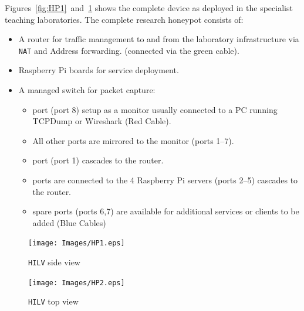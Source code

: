 \documentclass{llncs}
\begin{document}
Figures~\ref{fig:HP1}~and~\ref{fig:HP2} shows the complete device as deployed
in the specialist teaching laboratories. The complete research honeypot
consists of:

\begin{itemize}
    \item \noindent A router for traffic management to and from the laboratory
      infrastructure via \texttt{NAT} and Address forwarding. (connected via the
      green cable).  \item {} Raspberry Pi boards for service deployment.
    \item \noindent A managed switch for packet capture:
    \begin{itemize}
        \item {} port (port 8) setup as a monitor usually connected to
          a PC running TCPDump or Wireshark (Red Cable).
        \item \noindent All other ports are mirrored to the monitor (ports
          1--7).
        \item {} port (port 1) cascades to the router.
        \item {} ports are connected to the 4 Raspberry Pi servers
          (ports 2--5) cascades to the router.
        \item {} spare ports (ports 6,7) are available for additional
          services or clients to be added (Blue Cables)
    \end{itemize}
\end{itemize}

\begin{figure}[ht]
  \centering
  \begin{minipage}[h]{0.45\textwidth}
    \texttt{[image: Images/HP1.eps]}
    \caption{\texttt{HILV} side view\label{fig:HP1}}
  \end{minipage}
  \hfill
  \begin{minipage}[h]{0.45\textwidth}
    \texttt{[image: Images/HP2.eps]}
    \caption{\texttt{HILV} top view\label{fig:HP2}}
  \end{minipage}
\end{figure}

\end{document}
